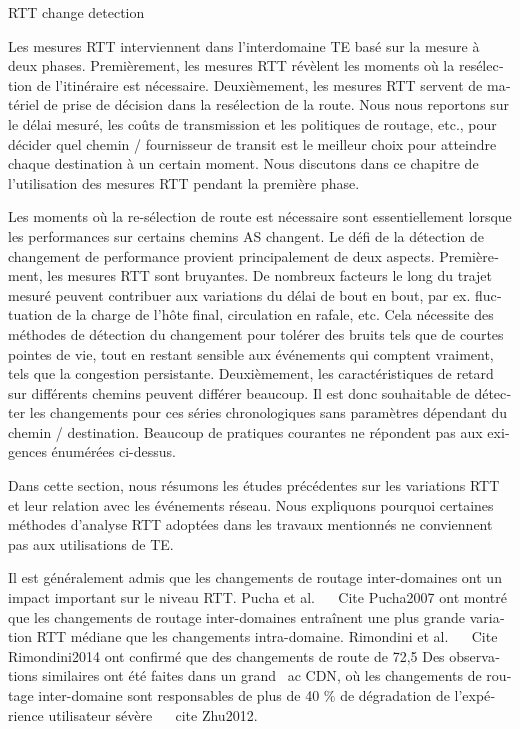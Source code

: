 \begin{otherlanguage}{french}
{RTT change detection

Les mesures RTT interviennent dans l'interdomaine TE basé sur la mesure à deux phases.
Premièrement, les mesures RTT révèlent les moments où la resélection de l'itinéraire est nécessaire. %
Deuxièmement, les mesures RTT servent de matériel de prise de décision dans la resélection de la route. Nous nous reportons sur le délai mesuré, les coûts de transmission et les politiques de routage, etc., pour décider quel chemin / fournisseur de transit est le meilleur choix pour atteindre chaque destination à un certain moment.
Nous discutons dans ce chapitre de l'utilisation des mesures RTT pendant la première phase.

Les moments où la re-sélection de route est nécessaire sont essentiellement lorsque les performances sur certains chemins AS changent.
Le défi de la détection de changement de performance provient principalement de deux aspects.
Premièrement, les mesures RTT sont bruyantes.
De nombreux facteurs le long du trajet mesuré peuvent contribuer aux variations du délai de bout en bout, par ex. fluctuation de la charge de l'hôte final, circulation en rafale, etc.
Cela nécessite des méthodes de détection du changement pour tolérer des bruits tels que de courtes pointes de vie, tout en restant sensible aux événements qui comptent vraiment, tels que la congestion persistante.
Deuxièmement, les caractéristiques de retard sur différents chemins peuvent différer beaucoup.
Il est donc souhaitable de détecter les changements pour ces séries chronologiques sans paramètres dépendant du chemin / destination.
Beaucoup de pratiques courantes ne répondent pas aux exigences énumérées ci-dessus.

Dans cette section, nous résumons les études précédentes sur les variations RTT et leur relation avec les événements réseau.
Nous expliquons pourquoi certaines méthodes d'analyse RTT adoptées dans les travaux mentionnés ne conviennent pas aux utilisations de TE.

Il est généralement admis que les changements de routage inter-domaines ont un impact important sur le niveau RTT.
Pucha et al. ~ \ Cite {Pucha2007} ont montré que les changements de routage inter-domaines entraînent une plus grande variation RTT médiane que les changements intra-domaine.
Rimondini et al. ~ \ Cite {Rimondini2014} ont confirmé que des changements de route de 72,5%
Des observations similaires ont été faites dans un grand \ ac {CDN}, où les changements de routage inter-domaine sont responsables de plus de 40 $ \% $ de dégradation de l'expérience utilisateur sévère ~ \ cite {Zhu2012}.

}
\end{otherlanguage}
